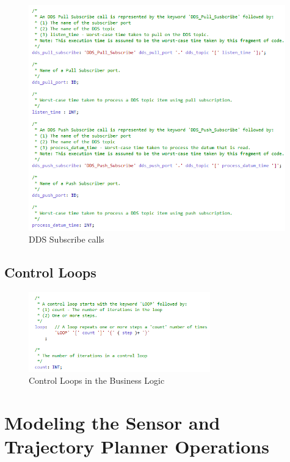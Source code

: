 \begin{figure}[ht]
\centering
\includegraphics[width=0.99\textwidth]{./figs/Grammar_6}
\caption{DDS Subscribe calls}
\label{fig:grammar6}
\vspace{-0.2in}
\end{figure}
\vspace{0.1in}

\subsection{Control Loops}

\begin{figure}[ht]
\centering
\includegraphics[width=0.70\textwidth]{./figs/Grammar_7}
\caption{Control Loops in the Business Logic}
\label{fig:grammar7}
\vspace{-0.2in}
\end{figure}
\vspace{0.1in}


\section{Modeling the Sensor and Trajectory Planner Operations}

